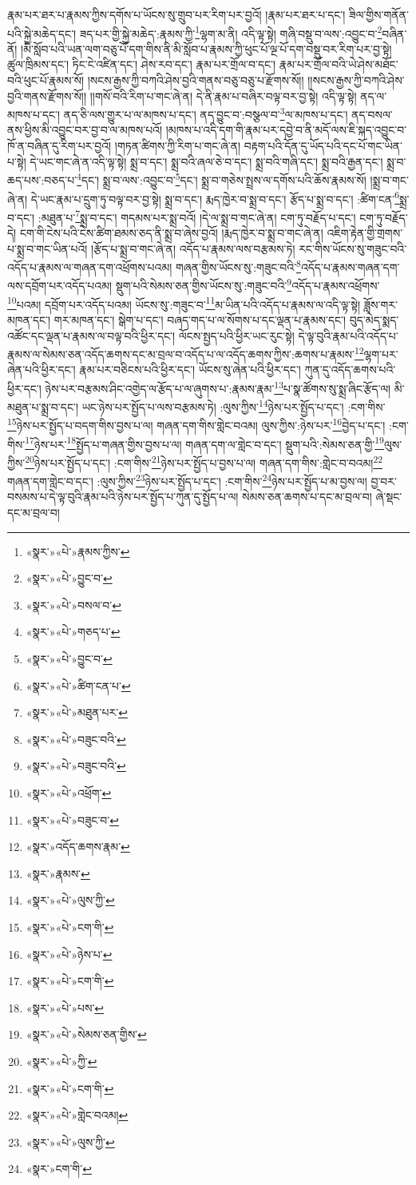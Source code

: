རྣམ་པར་ཐར་པ་རྣམས་ཀྱིས་དགོས་པ་ཡོངས་སུ་གྲུབ་པར་རིག་པར་བྱའོ། །རྣམ་པར་ཐར་པ་དང་། ཟིལ་གྱིས་གནོན་པའི་སྐྱེ་མཆེད་དང་། ཟད་པར་གྱི་སྐྱེ་མཆེད་:རྣམས་ཀྱི་\footnote{«སྣར་»«པེ་»རྣམས་ཀྱིས་}ལྷག་མ་ནི། འདི་ལྟ་སྟེ། གཞི་བསྡུ་བ་ལས་:འབྱུང་བ་\footnote{«སྣར་»«པེ་»བྱུང་བ་}བཞིན་ནོ། །མི་སློབ་པའི་ཡན་ལག་བཅུ་པོ་དག་གིས་ནི་མི་སློབ་པ་རྣམས་ཀྱི་ཕུང་པོ་ལྔ་པོ་དག་བསྡུ་བར་རིག་པར་བྱ་སྟེ། ཚུལ་ཁྲིམས་དང་། ཏིང་ངེ་འཛིན་དང་། ཤེས་རབ་དང་། རྣམ་པར་གྲོལ་བ་དང་། རྣམ་པར་གྲོལ་བའི་ཡེ་ཤེས་མཐོང་བའི་ཕུང་པོ་རྣམས་སོ། །སངས་རྒྱས་ཀྱི་བཀའི་ཤེས་བྱའི་གནས་བཅུ་བཅུ་པ་རྫོགས་སོ།། །།སངས་རྒྱས་ཀྱི་བཀའི་ཤེས་བྱའི་གནས་རྫོགས་སོ།། །།གསོ་བའི་རིག་པ་གང་ཞེ་ན། དེ་ནི་རྣམ་པ་བཞིར་བལྟ་བར་བྱ་སྟེ། འདི་ལྟ་སྟེ། ནད་ལ་མཁས་པ་དང་། ནད་ཅི་ལས་གྱུར་པ་ལ་མཁས་པ་དང་། ནད་བྱུང་བ་:བསྩལ་བ་\footnote{«སྣར་»«པེ་»བསལ་བ་}ལ་མཁས་པ་དང་། ནད་བསལ་ནས་ཕྱིས་མི་འབྱུང་བར་བྱ་བ་ལ་མཁས་པའོ། །མཁས་པ་འདི་དག་གི་རྣམ་པར་དབྱེ་བ་ནི་མདོ་ལས་ཇི་སྐད་འབྱུང་བ་ཁོ་ན་བཞིན་དུ་རིག་པར་བྱའོ། །གཏན་ཚིགས་ཀྱི་རིག་པ་གང་ཞེ་ན། བརྟག་པའི་དོན་དུ་ཡོད་པའི་དང་པོ་གང་ཡིན་པ་སྟེ། དེ་ཡང་གང་ཞེ་ན་འདི་ལྟ་སྟེ། སྨྲ་བ་དང་། སྨྲ་བའི་ཞལ་ཅེ་བ་དང་། སྨྲ་བའི་གཞི་དང་། སྨྲ་བའི་རྒྱན་དང་། སྨྲ་བ་ཆད་པས་:བཅད་པ་\footnote{«སྣར་»«པེ་»གཅད་པ་}དང་། སྨྲ་བ་ལས་:འབྱུང་བ་\footnote{«སྣར་»«པེ་»བྱུང་བ་}དང་། སྨྲ་བ་གཅེས་སྤྲས་ལ་དགོས་པའི་ཆོས་རྣམས་སོ། །སྨྲ་བ་གང་ཞེ་ན། དེ་ཡང་རྣམ་པ་དྲུག་ཏུ་བལྟ་བར་བྱ་སྟེ། སྨྲ་བ་དང་། རྨད་ཁྱེར་བ་སྨྲ་བ་དང་། རྩོད་པ་སྨྲ་བ་དང་། :ཚིག་ངན་\footnote{«སྣར་»«པེ་»ཚིག་ངན་པ་}སྨྲ་བ་དང་། :མཐུན་པ་\footnote{«སྣར་»«པེ་»མཐུན་པར་}སྨྲ་བ་དང་། གདམས་པར་སྨྲ་བའོ། །དེ་ལ་སྨྲ་བ་གང་ཞེ་ན། ངག་ཏུ་བརྗོད་པ་དང་། ངག་ཏུ་བརྗོད་དེ། ངག་གི་ངེས་པའི་ངེས་ཚིག་ཐམས་ཅད་ནི་སྨྲ་བ་ཞེས་བྱའོ། །རྨད་ཁྱེར་བ་སྨྲ་བ་གང་ཞེ་ན། འཇིག་རྟེན་གྱི་གྲགས་པ་སྨྲ་བ་གང་ཡིན་པའོ། །རྩོད་པ་སྨྲ་བ་གང་ཞེ་ན། འདོད་པ་རྣམས་ལས་བརྩམས་ཏེ། རང་གིས་ཡོངས་སུ་གཟུང་བའི་འདོད་པ་རྣམས་ལ་གཞན་དག་འཕྲོགས་པའམ། གཞན་གྱིས་ཡོངས་སུ་:གཟུང་བའི་\footnote{«སྣར་»«པེ་»བཟུང་བའི་}འདོད་པ་རྣམས་གཞན་དག་ལས་དབྲོག་པར་འདོད་པའམ། སྡུག་པའི་སེམས་ཅན་གྱིས་ཡོངས་སུ་:གཟུང་བའི་\footnote{«སྣར་»«པེ་»བཟུང་བའི་}འདོད་པ་རྣམས་འཕྲོགས་\footnote{«སྣར་»«པེ་»འཕྲོག་}པའམ། དབྲོག་པར་འདོད་པའམ། ཡོངས་སུ་:གཟུང་བ་\footnote{«སྣར་»«པེ་»བཟུང་བ་}མ་ཡིན་པའི་འདོད་པ་རྣམས་ལ་འདི་ལྟ་སྟེ། ཟློས་གར་མཁན་དང་། གར་མཁན་དང་། སྒེག་པ་དང་། བཞད་གད་པ་ལ་སོགས་པ་དང་ལྡན་པ་རྣམས་དང་། བུད་མེད་སྨད་འཚོང་དང་ལྡན་པ་རྣམས་ལ་བལྟ་བའི་ཕྱིར་དང་། ལོངས་སྤྱད་པའི་ཕྱིར་ཡང་རུང་སྟེ། དེ་ལྟ་བུའི་རྣམ་པའི་འདོད་པ་རྣམས་ལ་སེམས་ཅན་འདོད་ཆགས་དང་མ་བྲལ་བ་འདོད་པ་ལ་འདོད་ཆགས་ཀྱིས་:ཆགས་པ་རྣམས་\footnote{«སྣར་»འདོད་ཆགས་རྣམ་}ལྷག་པར་ཞེན་པའི་ཕྱིར་དང་། རྣམ་པར་བཅིངས་པའི་ཕྱིར་དང་། ཡོངས་སུ་ཞེན་པའི་ཕྱིར་དང་། ཀུན་དུ་འདོད་ཆགས་པའི་ཕྱིར་དང་། ཉེས་པར་བརྩམས་ཤིང་འགྱེད་ལ་རྩོད་པ་ལ་ཞུགས་པ་:རྣམས་རྣམ་\footnote{«སྣར་»རྣམས་}པ་སྣ་ཚོགས་སུ་སྨྲ་ཞིང་རྩོད་ལ། མི་མཐུན་པ་སྨྲ་བ་དང་། ཡང་ཉེས་པར་སྤྱོད་པ་ལས་བརྩམས་ཏེ། :ལུས་ཀྱིས་\footnote{«སྣར་»«པེ་»ལུས་ཀྱི་}ཉེས་པར་སྤྱོད་པ་དང་། :ངག་གིས་\footnote{«སྣར་»«པེ་»ངག་གི་}ཉེས་པར་སྤྱོད་པ་བདག་གིས་བྱས་པ་ལ། གཞན་དག་གིས་གླེང་བའམ། ལུས་ཀྱིས་:ཉེས་པར་\footnote{«སྣར་»«པེ་»ཉེས་པ་}བྱེད་པ་དང་། :ངག་གིས་\footnote{«སྣར་»«པེ་»ངག་གི་}ཉེས་པར་\footnote{«སྣར་»«པེ་»པས་}སྤྱོད་པ་གཞན་གྱིས་བྱས་པ་ལ། གཞན་དག་ལ་གླེང་བ་དང་། སྡུག་པའི་:སེམས་ཅན་གྱི་\footnote{«སྣར་»«པེ་»སེམས་ཅན་གྱིས་}ལུས་ཀྱིས་\footnote{«སྣར་»«པེ་»ཀྱི་}ཉེས་པར་སྤྱོད་པ་དང་། :ངག་གིས་\footnote{«སྣར་»«པེ་»ངག་གི་}ཉེས་པར་སྤྱོད་པ་བྱས་པ་ལ། གཞན་དག་གིས་:གླེང་བ་བའམ།\footnote{«སྣར་»«པེ་»གླེང་བའམ།} གཞན་དག་གླེང་བ་དང་། :ལུས་ཀྱིས་\footnote{«སྣར་»«པེ་»ལུས་ཀྱི་}ཉེས་པར་སྤྱོད་པ་དང་། :ངག་གིས་\footnote{«སྣར་»ངག་གི་}ཉེས་པར་སྤྱོད་པ་མ་བྱས་ལ། བྱ་བར་བསམས་པ་དེ་ལྟ་བུའི་རྣམ་པའི་ཉེས་པར་སྤྱོད་པ་ཀུན་དུ་སྤྱོད་པ་ལ། སེམས་ཅན་ཆགས་པ་དང་མ་བྲལ་བ། ཞེ་སྡང་དང་མ་བྲལ་བ། 